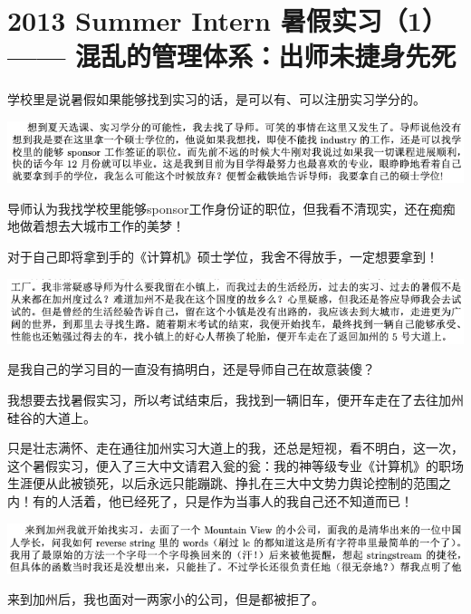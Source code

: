 \documentclass[9pt, b5paper]{article}
\begin{document}
\section{2013 Summer Intern 暑假实习（1） —— 混乱的管理体系：出师未捷身先死}
\label{sec:orgef1511b}

学校里是说暑假如果能够找到实习的话，是可以有、可以注册实习学分的。 

\begin{center}
\includegraphics[width=.9\linewidth]{./pic/backups_plans_20210424_220153.png}
\end{center}

导师认为我找学校里能够sponsor工作身份证的职位，但我看不清现实，还在痴痴地做着想去大城市工作的美梦！

对于自己即将拿到手的《计算机》硕士学位，我舍不得放手，一定想要拿到！

\begin{center}
\includegraphics[width=.9\linewidth]{./pic/backups_plans_20210424_220214.png}
\end{center}

是我自己的学习目的一直没有搞明白，还是导师自己在故意装傻？

我想要去找暑假实习，所以考试结束后，我找到一辆旧车，便开车走在了去往加州硅谷的大道上。 

只是壮志满怀、走在通往加州实习大道上的我，还总是短视，看不明白，这一次，这个暑假实习，便入了三大中文请君入瓮的瓮：我的神等级专业《计算机》的职场生涯便从此被锁死，以后永远只能蹦跳、挣扎在三大中文势力舆论控制的范围之内！有的人活着，他已经死了，只是作为当事人的我自己还不知道而已！

\begin{center}
\includegraphics[width=.9\linewidth]{./pic/backups_plans_20210504_205325.png}
\end{center}

来到加州后，我也面对一两家小的公司，但是都被拒了。 
\end{document}
